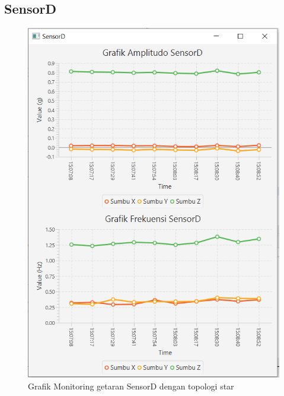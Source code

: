 \subsection{SensorD}
\begin{figure}[H] 
	\centering  
	\includegraphics[scale=1]{Lampiran/HasilPengujian/sensorD_star.PNG} 
	\caption[Grafik Monitoring getaran SensorD dengan topologi star]{Grafik Monitoring getaran SensorD dengan topologi star}
	\label{fig:grafik_D_star_paskal} 
\end{figure}

